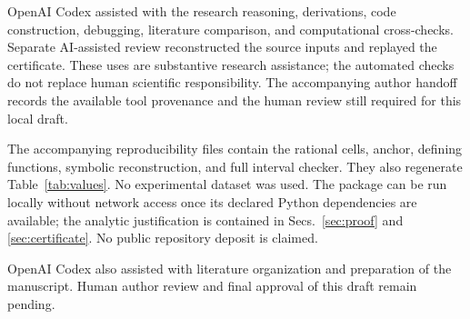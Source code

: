 \documentclass[aps,pra,reprint,amsmath,amssymb,longbibliography]{revtex4-2}
\begin{document}
OpenAI Codex assisted with the research reasoning, derivations, code construction, debugging, literature comparison, and computational cross-checks. Separate AI-assisted review reconstructed the source inputs and replayed the certificate. These uses are substantive research assistance; the automated checks do not replace human scientific responsibility. The accompanying author handoff records the available tool provenance and the human review still required for this local draft.

The accompanying reproducibility files contain the rational cells, anchor, defining functions, symbolic reconstruction, and full interval checker. They also regenerate Table~\ref{tab:values}. No experimental dataset was used. The package can be run locally without network access once its declared Python dependencies are available; the analytic justification is contained in Secs.~\ref{sec:proof} and \ref{sec:certificate}. No public repository deposit is claimed.

\begin{acknowledgments}
OpenAI Codex also assisted with literature organization and preparation of the manuscript. Human author review and final approval of this draft remain pending.
\end{acknowledgments}

\appendix
\end{document}
